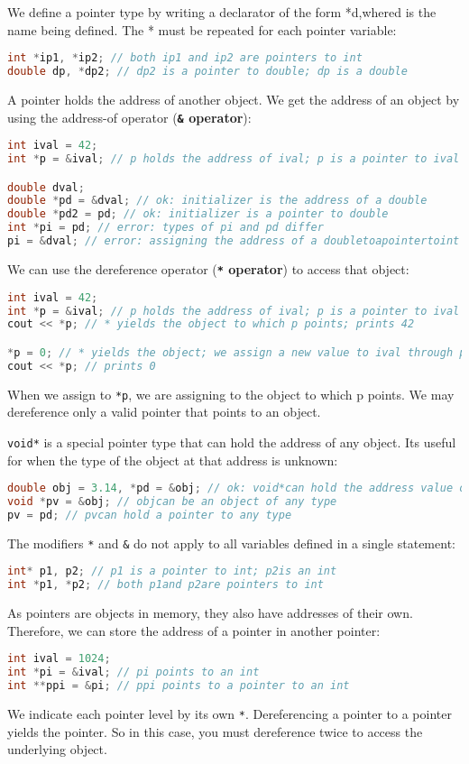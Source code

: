 We define a pointer type by writing a declarator of the form *d,whered is the name being defined. The * must be repeated for each pointer variable:
\begin{lstlisting}[language=C++]
int *ip1, *ip2; // both ip1 and ip2 are pointers to int 
double dp, *dp2; // dp2 is a pointer to double; dp is a double
\end{lstlisting}

A pointer holds the address of another object. We get the address of an object by using the address-of operator (\textbf{\texttt{\&} operator}):
\begin{lstlisting}[language=C++]
int ival = 42; 
int *p = &ival; // p holds the address of ival; p is a pointer to ival

double dval; 
double *pd = &dval; // ok: initializer is the address of a double 
double *pd2 = pd; // ok: initializer is a pointer to double 
int *pi = pd; // error: types of pi and pd differ 
pi = &dval; // error: assigning the address of a doubletoapointertoint
\end{lstlisting}

We can use the dereference operator (\textbf{\texttt{*} operator}) to access that object:
\begin{lstlisting}[language=C++]
int ival = 42; 
int *p = &ival; // p holds the address of ival; p is a pointer to ival 
cout << *p; // * yields the object to which p points; prints 42

*p = 0; // * yields the object; we assign a new value to ival through p 
cout << *p; // prints 0
\end{lstlisting}
When we assign to \texttt{*p}, we are assigning to the object to which p points. We may dereference only a valid pointer that points to an object.

\texttt{void*} is a special pointer type that can hold the address of any object. Its useful for when the type of the object at that address is unknown:
\begin{lstlisting}[language=C++]
double obj = 3.14, *pd = &obj; // ok: void*can hold the address value of any data pointer type 
void *pv = &obj; // objcan be an object of any type 
pv = pd; // pvcan hold a pointer to any type
\end{lstlisting}

The modifiers \texttt{*} and \texttt{\&} do not apply to all variables defined in a single statement:
\begin{lstlisting}[language=C++]
int* p1, p2; // p1 is a pointer to int; p2is an int
int *p1, *p2; // both p1and p2are pointers to int
\end{lstlisting}

As pointers are objects in memory, they also have addresses of their own. Therefore, we can store the address of a pointer in another pointer:
\begin{lstlisting}[language=C++]
int ival = 1024; 
int *pi = &ival; // pi points to an int 
int **ppi = &pi; // ppi points to a pointer to an int
\end{lstlisting}
We indicate each pointer level by its own \texttt{*}. Dereferencing a pointer to a pointer yields the pointer. So in this case, you must dereference twice to access the underlying object.